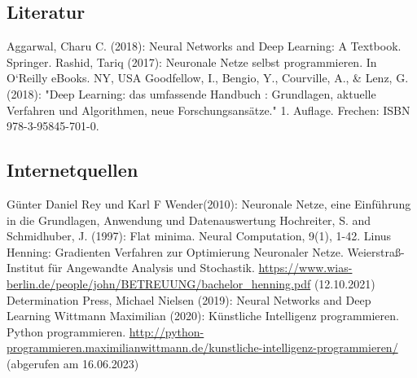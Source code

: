 \documentclass[a4paper,12pt,oneside]{article}
\begin{document}
    \subsection{Literatur}
    \renewcommand{\refname}{} %
    \begin{thebibliography}{SW11} %
       Aggarwal, Charu C. (2018): Neural Networks and Deep Learning: A Textbook. Springer.
       Rashid, Tariq (2017): Neuronale Netze selbst programmieren. In O`Reilly eBooks. NY, USA
       Goodfellow, I., Bengio, Y., Courville, A., \& Lenz, G. (2018): "Deep Learning: das umfassende Handbuch : Grundlagen, aktuelle Verfahren und Algorithmen, neue Forschungsansätze." 1. Auflage. Frechen: ISBN 978-3-95845-701-0.
    \end{thebibliography} 
        
    \subsection{Internetquellen}
    \begin{thebibliography}{HR08} %
       Günter Daniel Rey und Karl F Wender(2010): Neuronale Netze, eine Einführung in die Grundlagen, Anwendung und Datenauswertung
       Hochreiter, S. and Schmidhuber, J. (1997): Flat minima. Neural Computation, 9(1), 1-42.
       Linus Henning: Gradienten Verfahren zur Optimierung Neuronaler Netze. Weierstraß-Institut für Angewandte Analysis und Stochastik. \url{https://www.wias-berlin.de/people/john/BETREUUNG/bachelor_henning.pdf} (12.10.2021)
       Determination Press, Michael Nielsen (2019): Neural Networks and Deep Learning
       Wittmann Maximilian (2020): Künstliche Intelligenz programmieren. Python programmieren. \url{http://python-programmieren.maximilianwittmann.de/kunstliche-intelligenz-programmieren/} (abgerufen am 16.06.2023)
    \end{thebibliography} 
  
\end{document}
